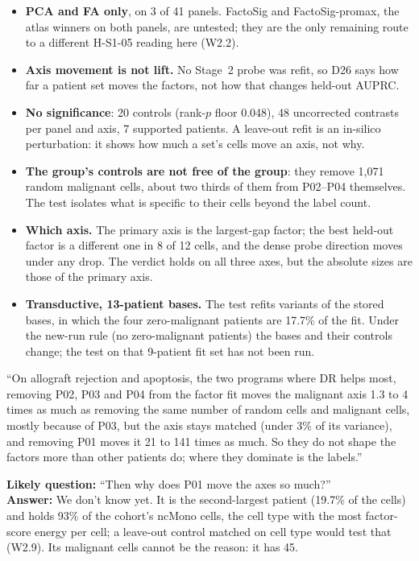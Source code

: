 \begin{caveatbox}
\begin{itemize}
\item \textbf{PCA and FA only}, on 3 of 41 panels. FactoSig and FactoSig-promax, the atlas winners on both panels, are untested; they are the only remaining route to a different H-S1-05 reading here (W2.2).
\item \textbf{Axis movement is not lift.} No Stage~2 probe was refit, so D26 says how far a patient set moves the factors, not how that changes held-out AUPRC.
\item \textbf{No significance}: 20 controls (rank-$p$ floor 0.048), 48 uncorrected contrasts per panel and axis, 7 supported patients. A leave-out refit is an in-silico perturbation: it shows how much a set's cells move an axis, not why.
\item \textbf{The group's controls are not free of the group}: they remove 1,071 random malignant cells, about two thirds of them from P02--P04 themselves. The test isolates what is specific to their cells beyond the label count.
\item \textbf{Which axis.} The primary axis is the largest-gap factor; the best held-out factor is a different one in 8 of 12 cells, and the dense probe direction moves under any drop. The verdict holds on all three axes, but the absolute sizes are those of the primary axis.
\item \textbf{Transductive, 13-patient bases.} The test refits variants of the stored bases, in which the four zero-malignant patients are 17.7\% of the fit. Under the new-run rule (no zero-malignant patients) the bases and their controls change; the test on that 9-patient fit set has not been run.
\end{itemize}
\end{caveatbox}

\begin{teambox}
``On allograft rejection and apoptosis, the two programs where DR helps most, removing P02, P03 and P04 from the factor fit moves the malignant axis 1.3 to 4 times as much as removing the same number of random cells and malignant cells, mostly because of P03, but the axis stays matched (under 3\% of its variance), and removing P01 moves it 21 to 141 times as much. So they do not shape the factors more than other patients do; where they dominate is the labels.''

\textbf{Likely question:} ``Then why does P01 move the axes so much?''\\
\textbf{Answer:} We don't know yet. It is the second-largest patient (19.7\% of the cells) and holds 93\% of the cohort's ncMono cells, the cell type with the most factor-score energy per cell; a leave-out control matched on cell type would test that (W2.9). Its malignant cells cannot be the reason: it has 45.
\end{teambox}


